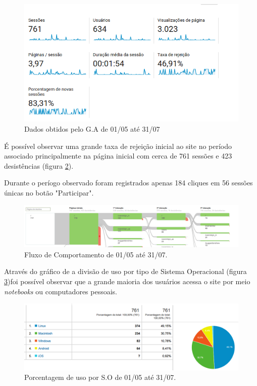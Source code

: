 \begin{figure}[htb]
\includegraphics[width=15cm]{figuras/analytics_1interacao_dados}
\caption{\label{fig:analytics_1interacao_dados} Dados obtidos pelo G.A de 01/05 até 31/07}
\end{figure}

\par É possível observar uma grande taxa de rejeição inicial ao site no período associado principalmente na página inicial com cerca de 761 sessões e 423 desistências (figura \ref{fig:analytics_1ainteracao_fluxo}).
\par Durante o períogo observado foram registrados apenas 184 cliques em 56 sessões únicas no botão "Participar".
\begin{figure}[htb]
\includegraphics[width=15cm]{figuras/analytics_1ainteracao_fluxo}
\caption{\label{fig:analytics_1ainteracao_fluxo} Fluxo de Comportamento de 01/05 até 31/07.}
\end{figure}
\par Através do gráfico de a divisão de uso por tipo de Sistema Operacional (figura \ref{fig:analytics_1interacao_so})foi possível observar que a grande maioria dos usuários acessa o site por meio \emph{notebooks} ou computadores pessoais.
\begin{figure}[htb]
\includegraphics[width=15cm]{figuras/analytics_1interacao_so}
\caption{\label{fig:analytics_1interacao_so} Porcentagem de uso por S.O de 01/05 até 31/07.}
\end{figure}
